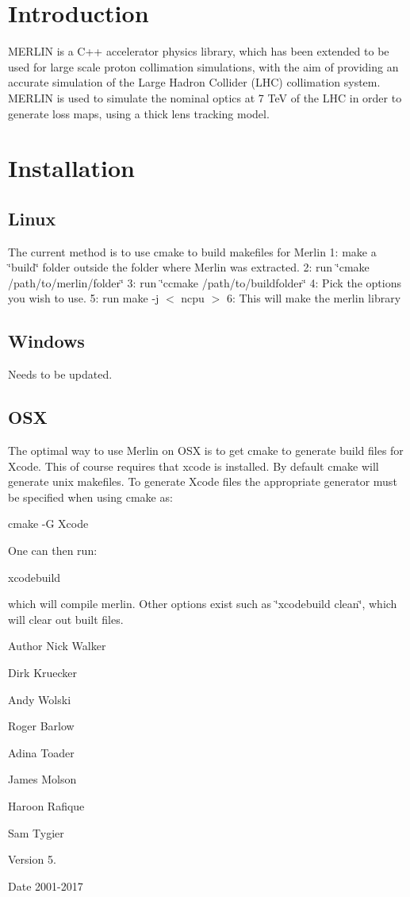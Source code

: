\hypertarget{index_intro_sec}{}\section{Introduction}\label{index_intro_sec}
M\+E\+R\+L\+IN is a C++ accelerator physics library, which has been extended to be used for large scale proton collimation simulations, with the aim of providing an accurate simulation of the Large Hadron Collider (L\+HC) collimation system. M\+E\+R\+L\+IN is used to simulate the nominal optics at 7 TeV of the L\+HC in order to generate loss maps, using a thick lens tracking model.\hypertarget{index_install_sec}{}\section{Installation}\label{index_install_sec}
\hypertarget{index_Linux}{}\subsection{Linux}\label{index_Linux}
The current method is to use cmake to build makefiles for Merlin 1\+: make a \char`\"{}build\char`\"{} folder outside the folder where Merlin was extracted. 2\+: run \char`\"{}cmake /path/to/merlin/folder\char`\"{} 3\+: run \char`\"{}ccmake /path/to/buildfolder\char`\"{} 4\+: Pick the options you wish to use. 5\+: run make -\/j $<$ ncpu $>$ 6\+: This will make the merlin library\hypertarget{index_Windows}{}\subsection{Windows}\label{index_Windows}
Needs to be updated. \hypertarget{index_OSX}{}\subsection{O\+SX}\label{index_OSX}
The optimal way to use Merlin on O\+SX is to get cmake to generate build files for Xcode. This of course requires that xcode is installed. By default cmake will generate unix makefiles. To generate Xcode files the appropriate generator must be specified when using cmake as\+:

cmake -\/G Xcode

One can then run\+:

xcodebuild

which will compile merlin. Other options exist such as \char`\"{}xcodebuild clean\char`\"{}, which will clear out built files.

\begin{DoxyAuthor}{Author}
Nick Walker 

Dirk Kruecker 

Andy Wolski 

Roger Barlow 

Adina Toader 

James Molson 

Haroon Rafique 

Sam Tygier 
\end{DoxyAuthor}
\begin{DoxyVersion}{Version}
5. 
\end{DoxyVersion}
\begin{DoxyDate}{Date}
2001-\/2017 
\end{DoxyDate}
